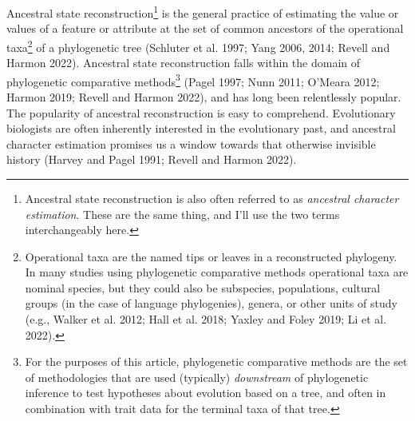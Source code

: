 \documentclass{article}
\begin{document}
Ancestral state reconstruction\footnote{Ancestral state reconstruction is also often referred to as \emph{ancestral character estimation}. These are the same thing, and I'll use the two terms interchangeably here.} is the general practice of estimating the value or values of a feature or attribute at the set of common ancestors of the operational taxa\footnote{Operational taxa are the named tips or leaves in a reconstructed phylogeny. In many studies using phylogenetic comparative methods operational taxa are nominal species, but they could also be subspecies, populations, cultural groups (in the case of language phylogenies), genera, or other units of study (e.g., Walker et al. 2012; Hall et al. 2018; Yaxley and Foley 2019; Li et al. 2022).} of a phylogenetic tree (Schluter et al. 1997; Yang 2006, 2014; Revell and Harmon 2022). Ancestral state reconstruction falls within the domain of phylogenetic comparative methods\footnote{For the purposes of this article, phylogenetic comparative methods are the set of methodologies that are used (typically) \emph{downstream} of phylogenetic inference to test hypotheses about evolution based on a tree, and often in combination with trait data for the terminal taxa of that tree.} (Pagel 1997; Nunn 2011; O'Meara 2012; Harmon 2019; Revell and Harmon 2022), and has long been relentlessly popular. The popularity of ancestral reconstruction is easy to comprehend. Evolutionary biologists are often inherently interested in the evolutionary past, and ancestral character estimation promises us a window towards that otherwise invisible history (Harvey and Pagel 1991; Revell and Harmon 2022).
\end{document}
